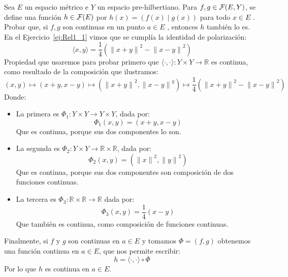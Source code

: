 \begin{ejercicio}
    Sea $E$ un espacio métrico e $Y$ un espacio pre-hilbertiano. Para $f,g \in \mathcal{F}(E,Y)$, se define una función $h \in \mathcal{F}(E)$ por $h(x)=\left(f(x)\mid g(x)\right)$ para todo $x\in E$ . Probar que, si $f,g$ son continuas en un punto $a \in E$ , entonces $h$ también lo es.\\

    \noindent
    En el Ejercicio~\ref{ej:Rel1_1} vimos que se cumplía la identidad de polarización:
    \begin{equation*}
        \langle x,y \rangle  = \dfrac{1}{4}\left({\|x+y\|}^{2} - {\|x-y\|}^{2}\right)
    \end{equation*}
    Propiedad que usaremos para probar primero que $\langle \cdot,\cdot \rangle:Y\times Y\to \mathbb{R} $ es continua, como resultado de la composición que ilustramos:
    \begin{equation*}
        (x,y) \longmapsto (x+y,x-y) \longmapsto \left({\|x+y\|}^{2}, {\|x-y\|}^{y}\right) \longmapsto \dfrac{1}{4}\left({\|x+y\|}^{2}-{\|x-y\|}^{2} \right)
    \end{equation*}
    Donde:
    \begin{itemize}
        \item La primera es $\Phi_1:Y\times Y \to Y\times Y$, dada por:
            \begin{equation*}
                \Phi_1(x,y) = (x+y,x-y)
            \end{equation*}
            Que es continua, porque sus dos componentes lo son.
        \item La segunda es $\Phi_2:Y\times Y \to \mathbb{R}\times \mathbb{R}$, dada por:
            \begin{equation*}
                \Phi_2(x,y) = \left({\|x\|}^{2}, {\|y\|}^{2}\right)
            \end{equation*}
            Que es continua, porque sus dos componentes son composición de dos funciones continuas.
        \item La tercera es $\Phi_3:\mathbb{R}\times \mathbb{R}\to \mathbb{R}$ dada por:
            \begin{equation*}
                \Phi_3(x,y) = \dfrac{1}{4}(x-y)
            \end{equation*}
            Que también es continua, como composición de funciones continuas.
    \end{itemize}
    Finalmente, si $f$ y $g$ son continuas en $a\in E$ y tomamos $\Phi = (f,g)$ obtenemos una función continua en $a\in E$, que nos permite escribir:
    \begin{equation*}
        h = \langle \cdot,\cdot \rangle  \circ \Phi
    \end{equation*}
    Por lo que $h$ es continua en $a\in E$.
\end{ejercicio}


